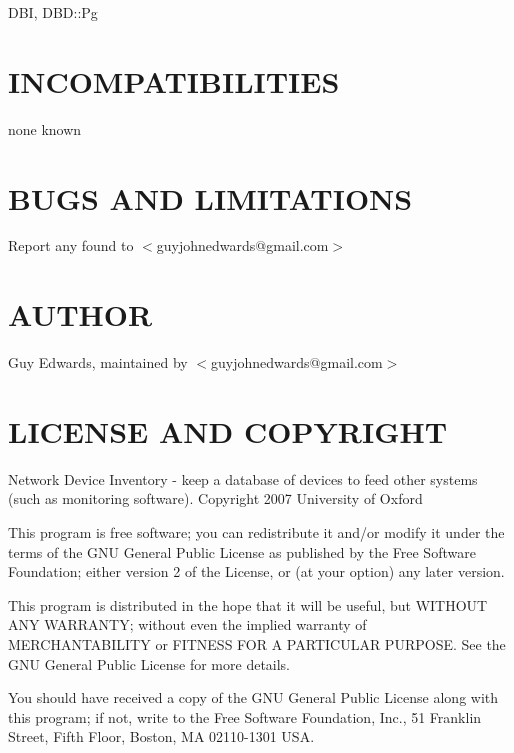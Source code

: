 \documentclass{book}
\begin{document}
DBI, DBD::Pg


\section{INCOMPATIBILITIES}
\label{_INCOMPATIBILITIES}
\hypertarget{_INCOMPATIBILITIES}{}



none known


\section{BUGS AND LIMITATIONS}
\label{_BUGS_AND_LIMITATIONS}
\hypertarget{_BUGS_AND_LIMITATIONS}{}



Report any found to $<$guyjohnedwards@gmail.com$>$


\section{AUTHOR}
\label{_AUTHOR}
\hypertarget{_AUTHOR}{}



Guy Edwards, maintained by $<$guyjohnedwards@gmail.com$>$


\section{LICENSE AND COPYRIGHT}
\label{_LICENSE_AND_COPYRIGHT}
\hypertarget{_LICENSE_AND_COPYRIGHT}{}



Network Device Inventory - keep a database of devices to feed other systems (such as monitoring software). Copyright 2007 University of Oxford



This program is free software; you can redistribute it and/or modify it under the terms of the GNU General Public License as published by the Free Software Foundation; either version 2 of the License, or (at your option) any later version.



This program is distributed in the hope that it will be useful, but WITHOUT ANY WARRANTY; without even the implied warranty of MERCHANTABILITY or FITNESS FOR A PARTICULAR PURPOSE. See the GNU General Public License for more details.



You should have received a copy of the GNU General Public License along with this program; if not, write to the Free Software Foundation, Inc., 51 Franklin Street, Fifth Floor, Boston, MA 02110-1301 USA.
\end{document}
